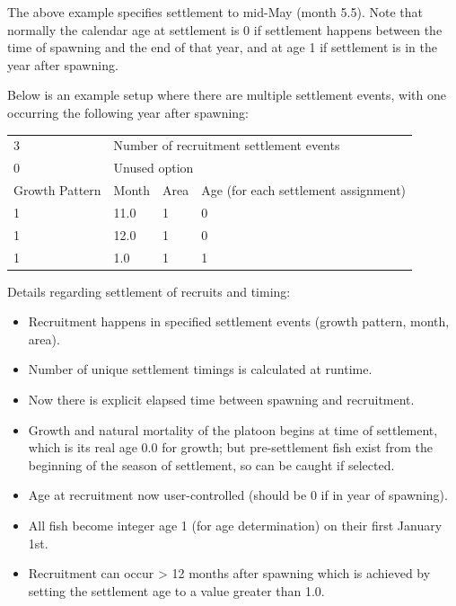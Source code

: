The above example specifies settlement to mid-May (month 5.5). Note that normally the calendar age at settlement is 0 if settlement happens between the time of spawning and the end of that year, and at age 1 if settlement is in the year after spawning. 

Below is an example setup where there are multiple settlement events, with one occurring the following year after spawning: 
\begin{center}
	\vspace*{-\baselineskip}
	\begin{tabular}{p{3cm} p{3cm} p{2cm} p{7cm}}
		\hline
		3 & \multicolumn{3}{l}{Number of recruitment settlement events} \Tstrut\\
		0 & \multicolumn{3}{l}{Unused option} \Bstrut\\
		\hline
		Growth Pattern & Month & Area & Age (for each settlement assignment) \Tstrut\Bstrut\\
		\hline
		1 & 11.0 & 1 & 0 \Tstrut\\
		1 & 12.0 & 1 & 0 \\
		1 & 1.0 & 1 & 1 \Bstrut\\
		\hline
	\end{tabular}		
\end{center}

Details regarding settlement of recruits and timing:
	\begin{itemize}
		\item Recruitment happens in specified settlement events (growth pattern, month, area).
		\item Number of unique settlement timings is calculated at runtime.
		\item Now there is explicit elapsed time between spawning and recruitment.
		\item Growth and natural mortality of the platoon begins at time of settlement, which is its real age 0.0 for growth; but pre-settlement fish exist from the beginning of the season of settlement, so can be caught if selected.
		\item Age at recruitment now user-controlled (should be 0 if in year of spawning).
		\item All fish become integer age 1 (for age determination) on their first January 1st.
		\item Recruitment can occur > 12 months after spawning which is achieved by setting the settlement age to a value greater than 1.0.		
	\end{itemize}

